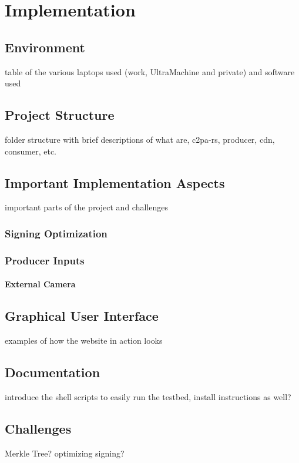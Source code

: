 \chapter{Implementation\label{cha:chapter5}}



\section{Environment\label{sec:env}}

table of the various laptops used (work, UltraMachine and private) and software used

\section{Project Structure\label{sec:projectstructure}}

folder structure with brief descriptions of what are, c2pa-rs, producer, cdn, consumer, etc.

\section{Important Implementation Aspects\label{sec:implaspects}}

important parts of the project and challenges

\subsection{Signing Optimization\label{sec:optimization}}

\subsection{Producer Inputs\label{sec:producer_inputs}}

\subsubsection{External Camera\label{sec:ext_cam}}

\section{Graphical User Interface\label{sec:gui}}

examples of how the website in action looks

\section{Documentation\label{sec:docu}}

introduce the shell scripts to easily run the testbed, install instructions as well?

\section{Challenges}

Merkle Tree? optimizing signing?


